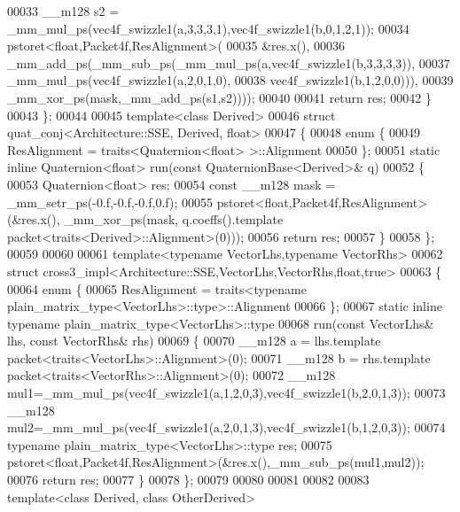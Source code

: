 \begin{DoxyCode}
00033     \_\_m128 s2 = \_mm\_mul\_ps(vec4f\_swizzle1(a,3,3,3,1),vec4f\_swizzle1(b,0,1,2,1));
00034     pstoret<float,Packet4f,ResAlignment>(
00035               &res.x(),
00036               \_mm\_add\_ps(\_mm\_sub\_ps(\_mm\_mul\_ps(a,vec4f\_swizzle1(b,3,3,3,3)),
00037                                     \_mm\_mul\_ps(vec4f\_swizzle1(a,2,0,1,0),
00038                                                vec4f\_swizzle1(b,1,2,0,0))),
00039                          \_mm\_xor\_ps(mask,\_mm\_add\_ps(s1,s2))));
00040     
00041     \textcolor{keywordflow}{return} res;
00042   \}
00043 \};
00044 
00045 \textcolor{keyword}{template}<\textcolor{keyword}{class} Derived>
00046 \textcolor{keyword}{struct }quat\_conj<Architecture::SSE, Derived, float>
00047 \{
00048   \textcolor{keyword}{enum} \{
00049     ResAlignment = traits<Quaternion<float> >::Alignment
00050   \};
00051   \textcolor{keyword}{static} \textcolor{keyword}{inline} Quaternion<float> run(\textcolor{keyword}{const} QuaternionBase<Derived>& q)
00052   \{
00053     Quaternion<float> res;
00054     \textcolor{keyword}{const} \_\_m128 mask = \_mm\_setr\_ps(-0.f,-0.f,-0.f,0.f);
00055     pstoret<float,Packet4f,ResAlignment>(&res.x(), \_mm\_xor\_ps(mask, q.coeffs().template 
      packet<traits<Derived>::Alignment>(0)));
00056     \textcolor{keywordflow}{return} res;
00057   \}
00058 \};
00059 
00060 
00061 \textcolor{keyword}{template}<\textcolor{keyword}{typename} VectorLhs,\textcolor{keyword}{typename} VectorRhs>
00062 \textcolor{keyword}{struct }cross3\_impl<Architecture::SSE,VectorLhs,VectorRhs,float,true>
00063 \{
00064   \textcolor{keyword}{enum} \{
00065     ResAlignment = traits<typename plain\_matrix\_type<VectorLhs>::type>::Alignment
00066   \};
00067   \textcolor{keyword}{static} \textcolor{keyword}{inline} \textcolor{keyword}{typename} plain\_matrix\_type<VectorLhs>::type
00068   run(\textcolor{keyword}{const} VectorLhs& lhs, \textcolor{keyword}{const} VectorRhs& rhs)
00069   \{
00070     \_\_m128 a = lhs.template packet<traits<VectorLhs>::Alignment>(0);
00071     \_\_m128 b = rhs.template packet<traits<VectorRhs>::Alignment>(0);
00072     \_\_m128 mul1=\_mm\_mul\_ps(vec4f\_swizzle1(a,1,2,0,3),vec4f\_swizzle1(b,2,0,1,3));
00073     \_\_m128 mul2=\_mm\_mul\_ps(vec4f\_swizzle1(a,2,0,1,3),vec4f\_swizzle1(b,1,2,0,3));
00074     \textcolor{keyword}{typename} plain\_matrix\_type<VectorLhs>::type res;
00075     pstoret<float,Packet4f,ResAlignment>(&res.x(),\_mm\_sub\_ps(mul1,mul2));
00076     \textcolor{keywordflow}{return} res;
00077   \}
00078 \};
00079 
00080 
00081 
00082 
00083 \textcolor{keyword}{template}<\textcolor{keyword}{class} Derived, \textcolor{keyword}{class} OtherDerived>

\end{DoxyCode}

